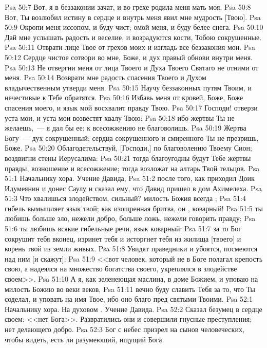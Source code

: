 \vs Psa 50:7 Вот, я в беззаконии зачат, и во грехе родила меня мать моя.
\vs Psa 50:8 Вот, Ты возлюбил истину в сердце и внутрь меня явил мне мудрость [Твою].
\vs Psa 50:9 Окропи меня иссопом, и буду чист; омой меня, и буду белее снега.
\vs Psa 50:10 Дай мне услышать радость и веселие, и возрадуются кости, Тобою сокрушенные.
\vs Psa 50:11 Отврати лице Твое от грехов моих и изгладь все беззакония мои.
\vs Psa 50:12 Сердце чистое сотвори во мне, Боже, и дух правый обнови внутри меня.
\vs Psa 50:13 Не отвергни меня от лица Твоего и Духа Твоего Святаго не отними от меня.
\vs Psa 50:14 Возврати мне радость спасения Твоего и Духом владычественным утверди меня.
\vs Psa 50:15 Научу беззаконных путям Твоим, и нечестивые к Тебе обратятся.
\vs Psa 50:16 Избавь меня от кровей, Боже, Боже спасения моего, и язык мой восхвалит правду Твою.
\vs Psa 50:17 Господи! отверзи уста мои, и уста мои возвестят хвалу Твою:
\vs Psa 50:18 ибо жертвы Ты не желаешь,~--- я дал бы ее; к всесожжению не благоволишь.
\vs Psa 50:19 Жертва Богу~--- дух сокрушенный; сердца сокрушенного и смиренного Ты не презришь, Боже.
\vs Psa 50:20 Облагодетельствуй, [Господи,] по благоволению Твоему Сион; воздвигни стены Иерусалима:
\vs Psa 50:21 тогда благоугодны будут Тебе жертвы правды, возношение и всесожжение; тогда возложат на алтарь Твой тельцов.
\vs Psa 51:1 Начальнику хора. Учение Давида,
\vs Psa 51:2 после того, как приходил Доик Идумеянин и донес Саулу и сказал ему, что Давид пришел в дом Ахимелеха.
\rsbpar\vs Psa 51:3 Что хвалишься злодейством, сильный? милость Божия всегда ;
\vs Psa 51:4 гибель вымышляет язык твой; как изощренная бритва, он , коварный!
\vs Psa 51:5 ты любишь больше зло, нежели добро, больше ложь, нежели говорить правду;
\vs Psa 51:6 ты любишь всякие гибельные речи, язык коварный:
\vs Psa 51:7 за то Бог сокрушит тебя вконец, изринет тебя и исторгнет тебя из жилища [твоего] и корень твой из земли живых.
\vs Psa 51:8 Увидят праведники и убоятся, посмеются над ним [и скажут]:
\vs Psa 51:9 <<вот человек, который не в Боге полагал крепость свою, а надеялся на множество богатства своего, укреплялся в злодействе своем>>.
\vs Psa 51:10 А я, как зеленеющая маслина, в доме Божием, и уповаю на милость Божию во веки веков,
\vs Psa 51:11 вечно буду славить Тебя за то, что Ты соделал, и уповать на имя Твое, ибо оно благо пред святыми Твоими.
\vs Psa 52:1 Начальнику хора. На духовом . Учение Давида.
\rsbpar\vs Psa 52:2 Сказал безумец в сердце своем: <<нет Бога>>. Развратились они и совершили гнусные преступления; нет делающего добро.
\vs Psa 52:3 Бог с небес призрел на сынов человеческих, чтобы видеть, есть ли разумеющий, ищущий Бога.
